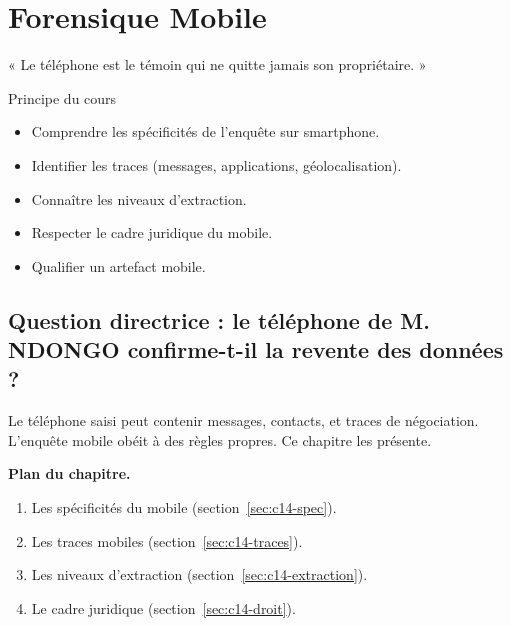 
\chapter{Forensique Mobile}
\label{chap:mobile}

\epigraph{%
    « Le téléphone est le témoin qui ne quitte jamais son propriétaire. »%
}{Principe du cours}


\begin{boxobjectifs}
\begin{itemize}
    \item Comprendre les spécificités de l'enquête sur smartphone.
    \item Identifier les traces (messages, applications, géolocalisation).
    \item Connaître les niveaux d'extraction.
    \item Respecter le cadre juridique du mobile.
    \item Qualifier un artefact mobile.
\end{itemize}
\end{boxobjectifs}

\bigskip

\section*{Question directrice : le téléphone de M. NDONGO confirme-t-il la revente des données ?}

Le téléphone saisi peut contenir messages, contacts, et traces de
négociation. L'enquête mobile obéit à des règles propres. Ce chapitre les
présente.

\medskip
\textbf{Plan du chapitre.}
\begin{enumerate}
    \item Les spécificités du mobile (section~\ref{sec:c14-spec}).
    \item Les traces mobiles (section~\ref{sec:c14-traces}).
    \item Les niveaux d'extraction (section~\ref{sec:c14-extraction}).
    \item Le cadre juridique (section~\ref{sec:c14-droit}).
\end{enumerate}

